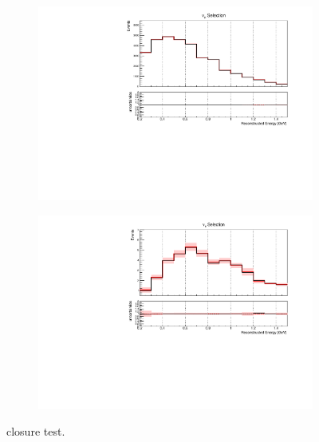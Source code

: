 \documentclass[a4paper]{article}
\begin{document}
\begin{figure}[H]
\begin{subfigure}[b]{0.45\textwidth}
        \includegraphics[width=\textwidth]{ConstraintClosureTests/2sigma_down/nuenumu_reco_e_H0_dataconstraint_All_GenieAll_Genie_scaled_numu.pdf}
        \end{subfigure}  
        \begin{subfigure}[b]{0.45\textwidth}
        \centering
        \includegraphics[width=\textwidth]{ConstraintClosureTests/2sigma_down/nuenumu_reco_e_H0_dataconstraint_All_GenieAll_Genie_univ_overlay_nue.pdf}
        \end{subfigure}
    \caption{closure test.}
    \label{fig::app:closure:2sigmadown}
\end{figure}
\end{document}
